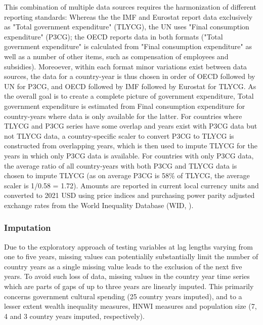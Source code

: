 \documentclass[11pt]{article}
\begin{document}
This combination of multiple data sources requires the harmonization of different reporting standards: 
Whereas the the IMF and Eurostat report data exclusively as "Total government expenditure" (TLYCG), the UN uses "Final consumption expenditure" (P3CG); the OECD reports data in both formats ("Total government expenditure" is calculated from "Final consumption expenditure" as well as a number of other items, such as compensation of employees and subsidies). 
Moreoever, within each format minor variations exist between data sources, the data for a country-year is thus chosen in order of OECD followed by UN for P3CG, and OECD followed by IMF followed by Eurostat for TLYCG.
As the overall goal is to create a complete picture of government expenditure, Total government expenditure is estimated from Final consumption expenditure for country-years where data is only available for the latter.
For countries where TLYCG and P3CG series have some overlap and years exist with P3CG data but not TLYCG data, a country-specific scaler to convert P3CG to TLYCG is constructed from overlapping years, which is then used to impute TLYCG for the years in which only P3CG data is available.
For countries with only P3CG data, the average ratio of all country-years with both P3CG and TLYCG data is chosen to impute TLYCG (as on average P3CG is 58\% of TLYCG, the average scaler is 1/0.58 = 1.72). 
Amounts are reported in current local currency units and converted to 2021 USD using price indices and purchasing power parity adjusted exchange rates from the World Inequality Database (WID,  \citeyear{WID_2021_WID}).

\subsubsection{Imputation}


Due to the exploratory approach of testing variables at lag lengths varying from one to five years, missing values can potentialily substantially limit the number of country years as a single missing value leads to the exclusion of the next five years.
To avoid such loss of data, missing values in the country year time series which are parts of gaps of up to three years are linearly imputed.
This primarily concerns government cultural spending (25 country years imputed), and to a lesser extent wealth inequality measures, HNWI measures and population size (7, 4 and 3 country years imputed, respectively).
\end{document}
